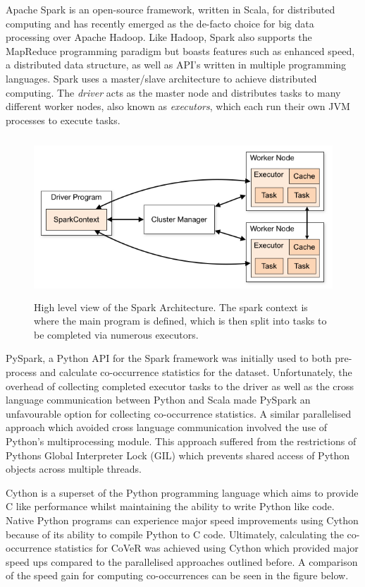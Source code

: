 \noindent
\newline
\newline
Apache Spark is an open-source framework, written in Scala, for distributed computing and has recently emerged as the de-facto choice for big data processing over Apache Hadoop. Like Hadoop, Spark also supports the MapReduce programming paradigm but boasts features such as enhanced speed, a distributed data structure, as well as API's written in multiple programming languages. Spark uses a master/slave architecture to achieve distributed computing. The \textit{driver} acts as the master node and distributes tasks to many different worker nodes, also known as \textit{executors}, which each run their own JVM processes to execute tasks.

\begin{figure}[h]
	\includegraphics[width=12cm, height=6cm]{./figures/fig5}
	\centering
	\caption{High level view of the Spark Architecture. The spark context is where the main program is defined, which is then split into tasks to be completed via numerous executors.}
	\label{fig:fig5}
\end{figure}

\noindent
\newline
PySpark, a Python API for the Spark framework was initially used to both pre-process and calculate co-occurrence statistics for the dataset. 
Unfortunately, the overhead of collecting completed executor tasks to the driver as well as the cross language communication between Python and Scala made PySpark an unfavourable option for collecting co-occurrence statistics. A similar parallelised approach which avoided cross language communication involved the use of Python's multiprocessing module. This approach suffered from the restrictions of Pythons Global Interpreter Lock (GIL) which prevents shared access of Python objects across multiple threads. 

\noindent
\newline
Cython is a superset of the Python programming language which aims to provide C like performance whilst maintaining the ability to write Python like code. Native Python programs can experience major speed improvements using Cython because of its ability to compile Python to C code. Ultimately, calculating the co-occurrence statistics for CoVeR was achieved using Cython which provided major speed ups compared to the parallelised approaches outlined before. A comparison of the speed gain for computing co-occurrences can be seen in the figure below.

